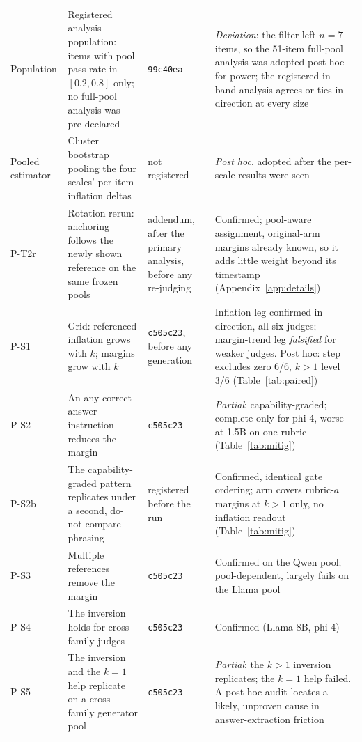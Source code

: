 \documentclass[11pt]{article}
\begin{document}
\begin{longtable}{L{1.7cm}L{5.3cm}L{2.5cm}L{5.1cm}}
\addlinespace[1pt]
Population & Registered analysis population: items with pool pass rate in $[0.2, 0.8]$ only; no full-pool analysis was pre-declared & \texttt{99c40ea} & \emph{Deviation}: the filter left $n{=}7$ items, so the 51-item full-pool analysis was adopted post hoc for power; the registered in-band analysis agrees or ties in direction at every size \\
\addlinespace[1pt]
Pooled estimator & Cluster bootstrap pooling the four scales' per-item inflation deltas & not registered & \emph{Post hoc}, adopted after the per-scale results were seen \\
\addlinespace[1pt]
P-T2r & Rotation rerun: anchoring follows the newly shown reference on the same frozen pools & addendum, after the primary analysis, before any re-judging & Confirmed; pool-aware assignment, original-arm margins already known, so it adds little weight beyond its timestamp (Appendix~\ref{app:details}) \\
\addlinespace[1pt]
P-S1 & Grid: referenced inflation grows with $k$; margins grow with $k$ & \texttt{c505c23}, before any generation & Inflation leg confirmed in direction, all six judges; margin-trend leg \emph{falsified} for weaker judges. Post hoc: step excludes zero 6/6, $k{>}1$ level 3/6 (Table~\ref{tab:paired}) \\
\addlinespace[1pt]
P-S2 & An any-correct-answer instruction reduces the margin & \texttt{c505c23} & \emph{Partial}: capability-graded; complete only for phi-4, worse at 1.5B on one rubric (Table~\ref{tab:mitig}) \\
\addlinespace[1pt]
P-S2b & The capability-graded pattern replicates under a second, do-not-compare phrasing & registered before the run & Confirmed, identical gate ordering; arm covers rubric-$a$ margins at $k{>}1$ only, no inflation readout (Table~\ref{tab:mitig}) \\
\addlinespace[1pt]
P-S3 & Multiple references remove the margin & \texttt{c505c23} & Confirmed on the Qwen pool; pool-dependent, largely fails on the Llama pool \\
\addlinespace[1pt]
P-S4 & The inversion holds for cross-family judges & \texttt{c505c23} & Confirmed (Llama-8B, phi-4) \\
\addlinespace[1pt]
P-S5 & The inversion and the $k{=}1$ help replicate on a cross-family generator pool & \texttt{c505c23} & \emph{Partial}: the $k{>}1$ inversion replicates; the $k{=}1$ help failed. A post-hoc audit locates a likely, unproven cause in answer-extraction friction \\

\end{longtable}
\end{document}
